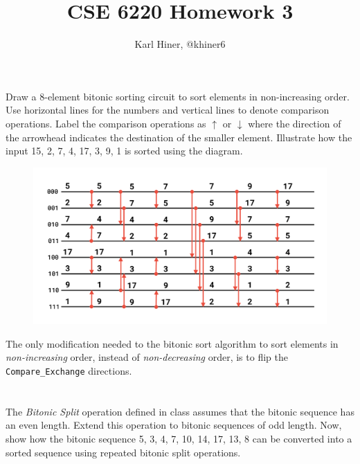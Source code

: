 \documentclass{article}
\begin{document}
\title{CSE 6220 Homework 3}
\author{Karl Hiner, @khiner6}
\date{}
\maketitle

\section{}
Draw a 8-element bitonic sorting circuit to sort elements in non-increasing order.
Use horizontal lines for the numbers and vertical lines to denote comparison operations.
Label the comparison operations as $\uparrow$ or $\downarrow$ where the direction of the arrowhead indicates
the destination of the smaller element.
Illustrate how the input 15, 2, 7, 4, 17, 3, 9, 1 is sorted using the diagram.

\begin{figure}[htb]
  \begin{center}
  \includegraphics[width=120mm]{bitonic_sort_reversed.pdf}
  \end{center}
\end{figure}

\quad The only modification needed to the bitonic sort algorithm to sort elements in \textit{non-increasing} order, instead of \textit{non-decreasing} order, is to flip the \verb|Compare_Exchange| directions.

\section{}
The \textit{Bitonic Split} operation defined in class assumes that the bitonic sequence has
an even length.
Extend this operation to bitonic sequences of odd length.
Now, show how the bitonic sequence 5, 3, 4, 7, 10, 14, 17, 13, 8 can be converted into a sorted sequence using
repeated bitonic split operations.
\end{document}
